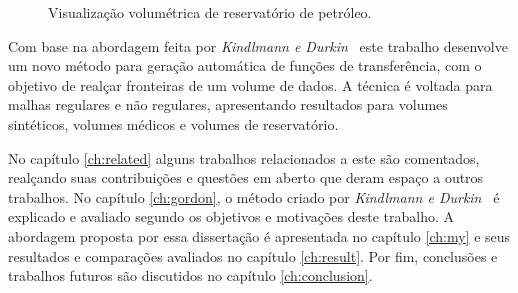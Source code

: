 \begin{figure}[h]
	\centering
    \caption{Visualização volumétrica de reservatório de petróleo.}
   	\label{fig:reserv}
\end{figure}
    
    Com base na abordagem feita por \textit{Kindlmann e Durkin}~\cite{gordon} este trabalho desenvolve um novo método para geração automática de funções de transferência, com o objetivo de realçar fronteiras de um volume de dados. A técnica é voltada para malhas regulares e não regulares, apresentando resultados para volumes sintéticos, volumes médicos e volumes de reservatório.

    No capítulo \ref{ch:related} alguns trabalhos relacionados a este são comentados, realçando suas contribuições e questões em aberto que deram espaço a outros trabalhos. No capítulo \ref{ch:gordon}, o método criado por \textit{Kindlmann e Durkin}~\cite{gordon} é explicado e avaliado segundo os objetivos e motivações deste trabalho. A abordagem proposta por essa dissertação é apresentada no capítulo \ref{ch:my} e seus resultados e comparações avaliados no capítulo \ref{ch:result}. Por fim, conclusões e trabalhos futuros são discutidos no capítulo \ref{ch:conclusion}.